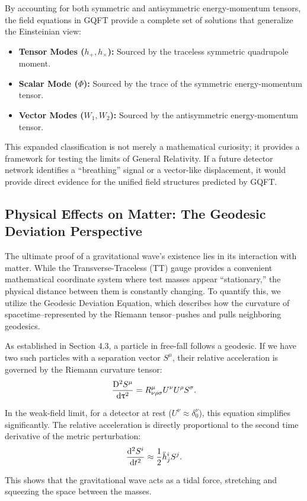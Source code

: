 By accounting for both symmetric and antisymmetric energy-momentum tensors, the field equations in GQFT provide a complete set of solutions that generalize the Einsteinian view:
\begin{itemize}
  \item \textbf{Tensor Modes ($h_+, h_\times$):} Sourced by the traceless symmetric quadrupole moment.
  \item \textbf{Scalar Mode ($\Phi$):} Sourced by the trace of the symmetric energy-momentum tensor.
  \item \textbf{Vector Modes ($W_1, W_2$):} Sourced by the antisymmetric energy-momentum tensor.
\end{itemize}
This expanded classification is not merely a mathematical curiosity; it provides a framework for testing the limits of General Relativity. If a future detector network identifies a ``breathing'' signal or a vector-like displacement, it would provide direct evidence for the unified field structures predicted by GQFT.

\subsection{Physical Effects on Matter: The Geodesic Deviation Perspective} The ultimate proof of a gravitational wave's existence lies in its interaction with matter. While the Transverse-Traceless (TT) gauge provides a convenient mathematical coordinate system where test masses appear ``stationary,'' the physical distance between them is constantly changing. To quantify this, we utilize the Geodesic Deviation Equation, which describes how the curvature of spacetime--represented by the Riemann tensor--pushes and pulls neighboring geodesics.

As established in Section 4.3, a particle in free-fall follows a geodesic. If we have two such particles with a separation vector $S^\mu$, their relative acceleration is governed by the Riemann curvature tensor:
\[%
  \codv[2]{S^\mu}{\tau} = R^\mu_{\nu\rho\sigma} U^\nu U^\rho S^\sigma
.\]%

In the weak-field limit, for a detector at rest ($U^\nu \approx \delta^\nu_0$), this equation simplifies significantly. The relative acceleration is directly proportional to the second time derivative of the metric perturbation:
\[%
  \odv[2]{S^i}{t} \approx \frac{1}{2} \ddot{h}^i_{j} S^j
.\]%

This shows that the gravitational wave acts as a tidal force, stretching and squeezing the space between the masses.

